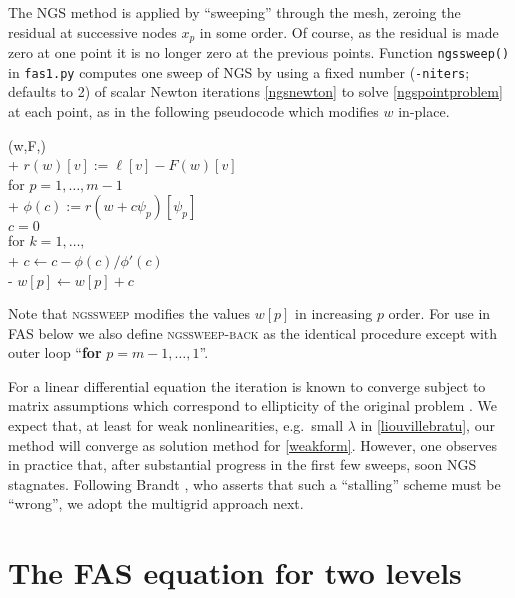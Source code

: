 \documentclass[letterpaper,final,12pt,reqno]{amsart}
\begin{document}
The NGS method is applied by ``sweeping'' through the mesh, zeroing the residual at successive nodes $x_p$ in some order.  Of course, as the residual is made zero at one point it is no longer zero at the previous points.  Function \texttt{ngssweep()} in \texttt{fas1.py} computes one sweep of NGS by using a fixed number (\texttt{-niters}; defaults to 2) of scalar Newton iterations \eqref{ngsnewton} to solve \eqref{ngspointproblem} at each point, as in the following pseudocode which modifies $w$ in-place.


\begin{pseudo*}
(w,F,\ell)\text{:} \\+
    $r(w)[v] := \ell[v] - F(w)[v]$ \\
    for $p=1,\dots,m-1$ \\+
        $\phi(c) := r(w + c \psi_p)[\psi_p]$ \\
        $c=0$ \\
        for $k=1,\dots,$ \\+
            $c \gets c - \phi(c) / \phi'(c)$ \\-
        $w[p] \gets w[p] + c$
\end{pseudo*}

Note that \textsc{ngssweep} modifies the values $w[p]$ in increasing $p$ order.  For use in FAS below we also define \textsc{ngssweep-back} as the identical procedure except with outer loop ``\textbf{for} $p=m-1,\dots,1$''.

For a linear differential equation the iteration is known to converge subject to matrix assumptions which correspond to ellipticity of the original problem \cite[for example]{Greenbaum1997}.  We expect that, at least for weak nonlinearities, e.g.~small $\lambda$ in \eqref{liouvillebratu}, our method will converge as solution method for \eqref{weakform}.  However, one observes in practice that, after substantial progress in the first few sweeps, soon NGS stagnates.  Following Brandt \cite{Brandt1977}, who asserts that such a ``stalling'' scheme must be ``wrong'', we adopt the multigrid approach next.


\section{The FAS equation for two levels}
\end{document}
